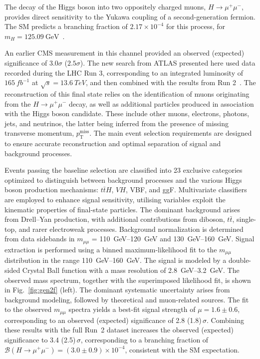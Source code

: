 \documentclass[a4paper,11pt]{article}
\begin{document}
The decay of the Higgs boson into two oppositely charged muons, $H \to
\mu^+\mu^-$, provides direct sensitivity to the Yukawa coupling of a
second-generation fermion. The SM predicts a branching fraction of
$2.17 \times 10^{-4}$ for this process, for $m_H =
125.09~\mathrm{GeV}$~\cite{yr2}.

An earlier CMS measurement in this channel provided an observed
(expected) significance of $3.0\sigma$ ($2.5\sigma$). The new search
from ATLAS presented here used data recorded during the LHC Run 3,
corresponding to an integrated luminosity of $\SI{165}{fb^{-1}}$ at
$\sqrt{s}=\SI{13.6}{TeV}$, and then combined with the results from Run
2~\cite{hmumu-atlas}.  The reconstruction of this final state relies on the
identification of muons originating from the $H \to \mu^+\mu^-$ decay,
as well as additional particles produced in association with the Higgs
boson candidate. These include other muons, electrons, photons, jets,
and neutrinos, the latter being inferred from the presence of missing
transverse momentum, $p_\mathrm{T}^{\text{miss}}$. The main event
selection requirements are designed to ensure accurate reconstruction
and optimal separation of signal and background processes.

Events passing the baseline selection are classified into 23 exclusive
categories optimized to distinguish between background processes and
the various Higgs boson production mechanisms: $t\bar{t}H$, $VH$, VBF,
and ggF. Multivariate classifiers are employed to enhance signal
sensitivity, utilising variables exploit the kinematic properties
of final-state particles.
%
The dominant background arises from Drell--Yan production, with
additional contributions from diboson, $t\bar{t}$, single-top, and
rarer electroweak processes. Background normalization is determined
from data sidebands in $m_{\mu\mu}$ =
\qtyrange[range-phrase=~--~]{110}{120}{GeV} and
\qtyrange[range-phrase=~--~]{130}{160}{GeV}. Signal extraction is
performed using a binned maximum-likelihood fit to the $m_{\mu\mu}$
distribution in the range
\qtyrange[range-phrase=~--~]{110}{160}{GeV}. The signal is modeled by
a double-sided Crystal Ball function with a mass resolution of
\qtyrange[range-phrase=~--~]{2.8}{3.2}{GeV}. The observed mass
spectrum, together with the superimposed likelihood fit, is shown in
Fig.~\ref{fig:gen2f} (left).
%
The dominant systematic uncertainty arises from background modeling,
followed by theoretical and muon-related sources. The fit to the
observed $m_{\mu\mu}$ spectra yields a best-fit signal strength of
$\mu = 1.6 \pm 0.6$, corresponding to an observed (expected)
significance of 2.8 (1.8)\,$\sigma$. Combining these results with the
full Run~2 dataset increases the observed (expected) significance to
3.4 (2.5)\,$\sigma$, corresponding to a branching fraction of $
\mathcal{B}(H \to \mu^+\mu^-) = (3.0 \pm 0.9) \times 10^{-4}$,
consistent with the SM expectation.
\end{document}
